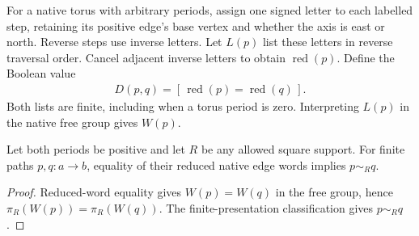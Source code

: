 \begin{definition}
    \label{def:peps_dual_reduced_edge_word}
    \leanok
    For a native torus with arbitrary periods, assign one signed letter
    to each labelled step, retaining its positive edge's base vertex and
    whether the axis is east or north. Reverse steps use inverse letters.
    Let $L(p)$ list these letters in reverse traversal order. Cancel adjacent
    inverse letters to obtain $\operatorname{red}(p)$. Define the Boolean value
    \begin{align}
        D(p,q)=[\,\operatorname{red}(p)=\operatorname{red}(q)\,].
        \label{eq:peps_dual_reduced_word_decision}
    \end{align}
    Both lists are finite, including when a torus period is zero.
    Interpreting $L(p)$ in the native free group gives $W(p)$.
\end{definition}

\begin{lemma}
    \label{lem:peps_dual_reduced_word_sufficient}
    \leanok
    Let both periods be positive and let $R$ be any allowed square support.
    For finite paths $p,q:a\to b$, equality of their reduced native edge words
    implies $p\sim_Rq$.
\end{lemma}
\begin{proof}\leanok
    Reduced-word equality gives $W(p)=W(q)$ in the free group, hence
    $\pi_R(W(p))=\pi_R(W(q))$. The finite-presentation classification gives
    $p\sim_Rq$.
\end{proof}

